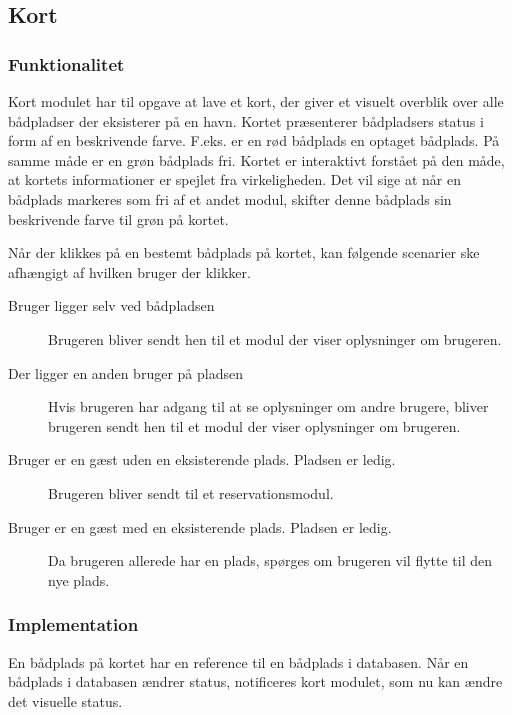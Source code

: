 \subsection{Kort}
\label{sub:kort}

\subsubsection{Funktionalitet}
\label{ssub:Funktionalitet}

Kort modulet har til opgave at lave et kort, der giver et visuelt overblik over alle bådpladser der eksisterer på en havn. Kortet præsenterer bådpladsers status i form af en beskrivende farve. F.eks. er en rød bådplads en optaget bådplads. På samme måde er en grøn bådplads fri. Kortet er interaktivt forstået på den måde, at kortets informationer er spejlet fra virkeligheden. Det vil sige at når en bådplads markeres som fri af et andet modul, skifter denne bådplads sin beskrivende farve til grøn på kortet.

Når der klikkes på en bestemt bådplads på kortet, kan følgende scenarier ske afhængigt af hvilken bruger der klikker.

\begin{description}
  \item[Bruger ligger selv ved bådpladsen] Brugeren bliver sendt hen til et modul der viser oplysninger om brugeren.
  \item[Der ligger en anden bruger på pladsen] Hvis brugeren har adgang til at se oplysninger om andre brugere, bliver brugeren sendt hen til et modul der viser oplysninger om brugeren.
  \item[Bruger er en gæst uden en eksisterende plads. Pladsen er ledig.] Brugeren bliver sendt til et reservationsmodul.
  \item[Bruger er en gæst med en eksisterende plads. Pladsen er ledig.] Da brugeren allerede har en plads, spørges om brugeren vil flytte til den nye plads.
\end{description}

\subsubsection{Implementation}
\label{ssub:Implementation}

En bådplads på kortet har en reference til en bådplads i databasen. Når en bådplads i databasen ændrer status, notificeres kort modulet, som nu kan ændre det visuelle status.

